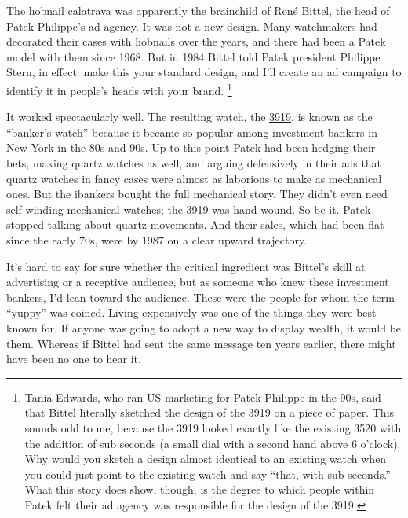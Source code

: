 The hobnail calatrava was apparently the brainchild of René Bittel, the
head of Patek Philippe's ad agency. It was not a new design. Many
watchmakers had decorated their cases with hobnails over the years, and
there had been a Patek model with them since 1968. But in 1984 Bittel
told Patek president Philippe Stern, in effect: make this your standard
design, and I'll create an ad campaign to identify it in people's heads
with your brand. \footnote{Tania Edwards, who ran US marketing for Patek Philippe in the
90s, said that Bittel literally sketched the design of the 3919 on a
piece of paper. This sounds odd to me, because the 3919 looked exactly
like the existing 3520 with the addition of sub seconds (a small dial
with a second hand above 6 o'clock). Why would you sketch a design
almost identical to an existing watch when you could just point to the
existing watch and say ``that, with sub seconds.'' What this story does
show, though, is the degree to which people within Patek felt their ad
agency was responsible for the design of the 3919.}

It worked spectacularly well. The resulting watch, the
\href{https://www.sothebys.com/en/buy/auction/2019/watches-online-6/patek-philippe-ref-3919j-a-yellow-gold-wristwatch/}{3919},
is known as the ``banker's watch'' because it became so popular among
investment bankers in New York in the 80s and 90s. Up to this point
Patek had been hedging their bets, making quartz watches as well, and
arguing defensively in their ads that quartz watches in fancy cases were
almost as laborious to make as mechanical ones. But the ibankers bought
the full mechanical story. They didn't even need self-winding mechanical
watches; the 3919 was hand-wound. So be it. Patek stopped talking about
quartz movements. And their sales, which had been flat since the early
70s, were by 1987 on a clear upward trajectory.

It's hard to say for sure whether the critical ingredient was Bittel's
skill at advertising or a receptive audience, but as someone who knew
these investment bankers, I'd lean toward the audience. These were the
people for whom the term ``yuppy'' was coined. Living expensively was
one of the things they were best known for. If anyone was going to adopt
a new way to display wealth, it would be them. Whereas if Bittel had
sent the same message ten years earlier, there might have been no one to
hear it.

